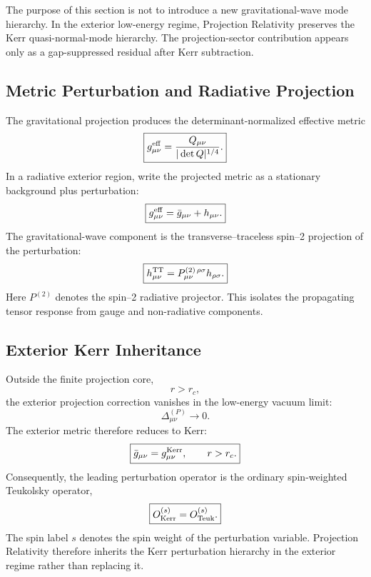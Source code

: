 \documentclass[11pt]{article}
\begin{document}
The purpose of this section is not to introduce a new gravitational-wave mode hierarchy. In the exterior low-energy regime, Projection Relativity preserves the Kerr quasi-normal-mode hierarchy. The projection-sector contribution appears only as a gap-suppressed residual after Kerr subtraction.

\subsection{Metric Perturbation and Radiative Projection}

The gravitational projection produces the determinant-normalized effective metric
\begin{equation}
\boxed{
g_{\mu\nu}^{\rm eff}
=
\frac{Q_{\mu\nu}}{|\det Q|^{1/4}}.
}
\end{equation}
In a radiative exterior region, write the projected metric as a stationary background plus perturbation:
\begin{equation}
\boxed{
g_{\mu\nu}^{\rm eff}
=
\bar g_{\mu\nu}
+
h_{\mu\nu}.
}
\end{equation}
The gravitational-wave component is the transverse--traceless spin--2 projection of the perturbation:
\begin{equation}
\boxed{
h_{\mu\nu}^{\rm TT}
=
P_{\mu\nu}^{(2)\,\rho\sigma}
h_{\rho\sigma}.
}
\end{equation}
Here \(P^{(2)}\) denotes the spin--2 radiative projector. This isolates the propagating tensor response from gauge and non-radiative components.

\subsection{Exterior Kerr Inheritance}

Outside the finite projection core,
\begin{equation}
\boxed{
r>r_c,
}
\end{equation}
the exterior projection correction vanishes in the low-energy vacuum limit:
\begin{equation}
\boxed{
\Delta_{\mu\nu}^{(P)}
\rightarrow0.
}
\end{equation}
The exterior metric therefore reduces to Kerr:
\begin{equation}
\boxed{
\bar g_{\mu\nu}
=
g_{\mu\nu}^{\rm Kerr},
\qquad
r>r_c.
}
\end{equation}
Consequently, the leading perturbation operator is the ordinary spin-weighted Teukolsky operator,
\begin{equation}
\boxed{
O_{\rm Kerr}^{(s)}
=
O_{\rm Teuk}^{(s)}.
}
\end{equation}
The spin label \(s\) denotes the spin weight of the perturbation variable. Projection Relativity therefore inherits the Kerr perturbation hierarchy in the exterior regime rather than replacing it.
\end{document}
